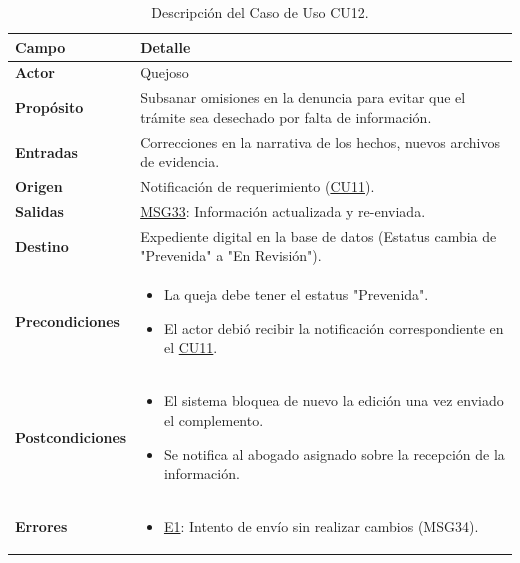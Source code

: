 \begin{appendices}
\begin{table}[htbp]
\centering
\small
\begin{tabular}{|p{3.5cm}|p{10.5cm}|}
\hline
\rowcolor[HTML]{EFEFEF} 
\textbf{Campo} & \textbf{Detalle} \\ \hline
\textbf{Actor} & Quejoso \\ \hline
\textbf{Propósito} & Subsanar omisiones en la denuncia para evitar que el trámite sea desechado por falta de información. \\ \hline
\textbf{Entradas} & Correcciones en la narrativa de los hechos, nuevos archivos de evidencia. \\ \hline
\textbf{Origen} & Notificación de requerimiento (\hyperlink{anexo:casos_uso}{CU11}). \\ \hline
\textbf{Salidas} & \hyperlink{msg:MSG33}{MSG33}: Información actualizada y re-enviada. \\ \hline
\textbf{Destino} & Expediente digital en la base de datos (Estatus cambia de "Prevenida" a "En Revisión"). \\ \hline
\textbf{Precondiciones} & 
\begin{itemize}[nosep, leftmargin=*]
    \item La queja debe tener el estatus "Prevenida".
    \item El actor debió recibir la notificación correspondiente en el \hyperlink{anexo:casos_uso}{CU11}.
\end{itemize} \\ \hline
\textbf{Postcondiciones} & 
\begin{itemize}[nosep, leftmargin=*]
    \item El sistema bloquea de nuevo la edición una vez enviado el complemento.
    \item Se notifica al abogado asignado sobre la recepción de la información.
\end{itemize} \\ \hline
\textbf{Errores} & 
\begin{itemize}[nosep, leftmargin=*]
    \item \hyperlink{err:E17}{E1}: Intento de envío sin realizar cambios (MSG34).
\end{itemize} \\ \hline
\end{tabular}
\caption{Descripción del Caso de Uso CU12.}
\label{tab:cu12_especificacion}
\end{table}


\end{appendices}
